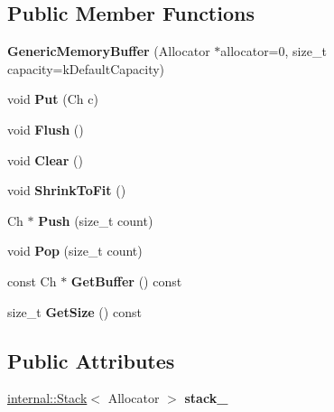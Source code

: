 \subsection*{Public Member Functions}
\begin{DoxyCompactItemize}
\item 
{\bfseries Generic\+Memory\+Buffer} (Allocator $\ast$allocator=0, size\+\_\+t capacity=k\+Default\+Capacity)\hypertarget{a00119_ad08f7da47bca43fcdb0c3b10e22dfa1d}{}\label{a00119_ad08f7da47bca43fcdb0c3b10e22dfa1d}

\item 
void {\bfseries Put} (Ch c)\hypertarget{a00119_a9dfb477983e211893601f8ab637b42d8}{}\label{a00119_a9dfb477983e211893601f8ab637b42d8}

\item 
void {\bfseries Flush} ()\hypertarget{a00119_a9861181cab6f5bec2ec08b601aa53575}{}\label{a00119_a9861181cab6f5bec2ec08b601aa53575}

\item 
void {\bfseries Clear} ()\hypertarget{a00119_a036cbe2556778e1edc525602a9821df2}{}\label{a00119_a036cbe2556778e1edc525602a9821df2}

\item 
void {\bfseries Shrink\+To\+Fit} ()\hypertarget{a00119_a3b87deb9bf34c394c8fb262ab53c0c4b}{}\label{a00119_a3b87deb9bf34c394c8fb262ab53c0c4b}

\item 
Ch $\ast$ {\bfseries Push} (size\+\_\+t count)\hypertarget{a00119_a56f7b14d2940b682fe592f598d6792ec}{}\label{a00119_a56f7b14d2940b682fe592f598d6792ec}

\item 
void {\bfseries Pop} (size\+\_\+t count)\hypertarget{a00119_a82a6706286f1356e1769282f5d496005}{}\label{a00119_a82a6706286f1356e1769282f5d496005}

\item 
const Ch $\ast$ {\bfseries Get\+Buffer} () const \hypertarget{a00119_a9afc78eef159fcbc10d0cea84ccfb26d}{}\label{a00119_a9afc78eef159fcbc10d0cea84ccfb26d}

\item 
size\+\_\+t {\bfseries Get\+Size} () const \hypertarget{a00119_adc22f10318fa6dbdf7eb1fa9041bb68d}{}\label{a00119_adc22f10318fa6dbdf7eb1fa9041bb68d}

\end{DoxyCompactItemize}
\subsection*{Public Attributes}
\begin{DoxyCompactItemize}
\item 
\hyperlink{a00283}{internal\+::\+Stack}$<$ Allocator $>$ {\bfseries stack\+\_\+}\hypertarget{a00119_a977b479180bebe8ae14ca1c11d52a486}{}\label{a00119_a977b479180bebe8ae14ca1c11d52a486}

\end{DoxyCompactItemize}
